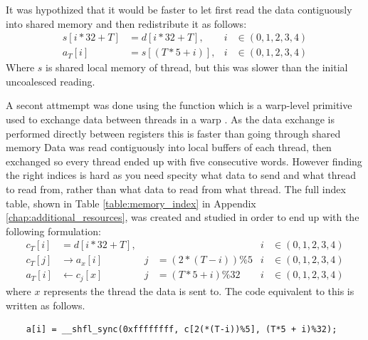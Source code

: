 It was hypothized that it would be faster to let first read the data contiguously into shared memory and then redistribute it as follows:
\begin{align}
    s[i*32+T] & = d[i*32+T],  & i & \in (0,1,2,3,4) \\
    a_T[i]    & = s[(T*5+i)], & i & \in (0,1,2,3,4)
    \label{eq:contiguous_reading}
\end{align}
Where $s$ is shared local memory of thread, but this was slower than the initial uncoalesced reading.


A secont attmempt was done using the  function which is a warp-level primitive used to exchange data between threads in a warp \cite{linUsingCUDAWarpLevel2018}.
As the data exchange is performed directly between registers this is faster than going through shared memory \cite{linUsingCUDAWarpLevel2018}
Data was read contiguously into local buffers of each thread, then exchanged so every thread ended up with five consecutive words.
However finding the right indices is hard as you need specity what data to send and what thread to read from, rather than what data to read from what thread.
The full index table, shown in Table \ref{table:memory_index} in Appendix \ref{chap:additional_resources}, was created and studied in order to end up with the following formulation:
\begin{align}
    c_T[i] & = d[i*32+T],       &   &                   & i & \in (0,1,2,3,4) \\
    c_T[j] & \rightarrow a_x[i] & j & = (2 * (T -i))\%5 & i & \in (0,1,2,3,4) \\
    a_T[i] & \leftarrow c_j[x]  & j & = (T*5 + i)\%32   & i & \in (0,1,2,3,4)
    \label{eq:contiguous_reading_shfl}
\end{align}
where $x$ represents the thread the data is sent to.
The code equivalent to this is written as follows.
\begin{verbatim}
    a[i] = __shfl_sync(0xffffffff, c[2(*(T-i))%5], (T*5 + i)%32);
\end{verbatim}
